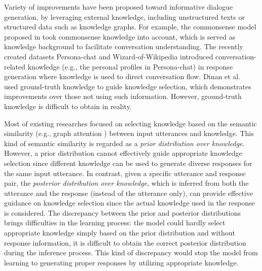 \documentclass{article}
\begin{document}
Variety of improvements \cite{zhou2018commonsense,ghazvininejad2018knowledge,liu2018knowledge} have been proposed toward informative dialogue generation, by leveraging external knowledge, including unstructured texts or structured data such as knowledge graphs.  
%
For example, the commonsense model proposed in \cite{zhou2018commonsense} took commonsense knowledge into account, which is served as knowledge background to facilitate conversation understanding.
The recently created datasets
Persona-chat \cite{zhang2018personalizing} and Wizard-of-Wikipedia \cite{dinan2018wizard} introduced conversation-related knowledge (e.g., the personal profiles in Persona-chat) in response generation 
where knowledge is used to direct conversation flow. 
Dinan et al.~ used ground-truth knowledge to guide knowledge selection, which demonstrates improvements over those not using such information.
However, ground-truth knowledge is difficult to obtain in reality.

Most of existing researches focused on selecting knowledge based on the semantic similarity (e.g., graph attention \cite{zhou2018commonsense}) between input utterances and knowledge.
This kind of semantic similarity is regarded as a \emph{prior distribution over knowledge}. 
However, a prior distribution cannot effectively guide appropriate knowledge selection since different knowledge can be used to generate diverse responses for the same input utterance. 
In contrast, given a specific utterance and response pair, 
the \emph{posterior distribution over knowledge}, which is inferred from both the utterance and the response (instead of the utterance only), can provide effective guidance on knowledge selection 
since the actual knowledge used in the response is considered. 
%
The discrepancy between the prior and posterior distributions brings difficulties in the learning process: 
the model could hardly select appropriate knowledge simply based on the prior distribution and without response information, 
it is difficult to obtain the correct posterior distribution during the inference process. 
This kind of discrepancy would stop the model from learning to generating proper responses by utilizing appropriate knowledge.

\end{document}
